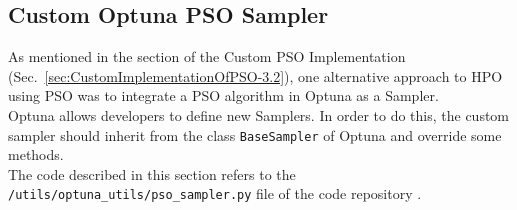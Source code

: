 % 
% 
% 
% 
% 
% 
% 

\subsection{Custom Optuna PSO Sampler}\label{sec:CustomOptunaPSOSampler-3.3.2}
As mentioned in the section of the Custom PSO Implementation (Sec.~\ref{sec:CustomImplementationOfPSO-3.2}), one alternative approach to HPO using PSO was to integrate a PSO algorithm in Optuna as a Sampler.
\\[0.3cm]Optuna allows developers to define new Samplers. In order to do this, the custom sampler should inherit from the class \texttt{BaseSampler} of Optuna and override some methods.
\\[0.3cm]The code described in this section refers to the \texttt{/utils/optuna\_utils/pso\_sampler.py} file of the code repository \cite{Repository-THESIS}.

